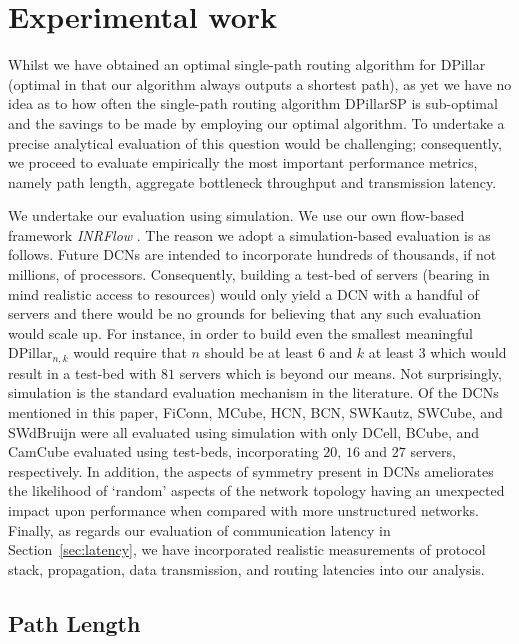 \documentclass{article}
\begin{document}
\section{Experimental work}
Whilst we have obtained an optimal single-path routing algorithm for DPillar (optimal in that our algorithm always outputs a shortest path), as yet we have no idea as to how often the single-path routing algorithm DPillarSP is sub-optimal and the savings to be made by employing our optimal algorithm. To undertake a precise analytical evaluation of this question would be challenging; consequently, we proceed to evaluate empirically the most important performance metrics, namely path length, aggregate bottleneck throughput and transmission latency.

We undertake our evaluation using simulation. We use our own flow-based framework \emph{INRFlow\/} \cite{INRFlow}. The reason we adopt a simulation-based evaluation is as follows. Future DCNs are intended to incorporate hundreds of thousands, if not millions, of processors. Consequently, building a test-bed of servers (bearing in mind realistic access to resources) would only yield a DCN with a handful of servers and there would be no grounds for believing that any such evaluation would scale up. For instance, in order to build even the smallest meaningful DPillar$_{n,k}$ would require that $n$ should be at least $6$ and $k$ at least $3$ which would result in a test-bed with $81$ servers which is beyond our means. Not surprisingly, simulation is the standard evaluation mechanism in the literature. Of the DCNs mentioned in this paper, FiConn, MCube, HCN, BCN, SWKautz, SWCube, and SWdBruijn were all evaluated using simulation with only DCell, BCube, and CamCube evaluated using test-beds, incorporating $20$, $16$ and $27$ servers, respectively. In addition, the aspects of symmetry present in DCNs ameliorates the likelihood of `random' aspects of the network topology having an unexpected impact upon performance when compared with more unstructured networks. Finally, as regards our evaluation of communication latency in Section~\ref{sec:latency}, we have incorporated realistic measurements of protocol stack, propagation, data transmission, and routing latencies into our analysis.

\subsection{Path Length}
\end{document}
